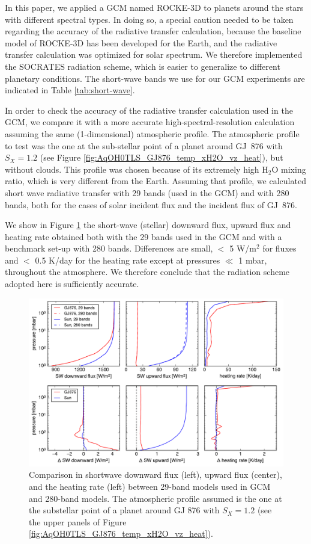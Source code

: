 \documentclass[11pt,numberedappendix,twocolappendix,]{emulateapj}
\def\water{H$_2$O }
\begin{document}
In this paper, we applied a GCM named ROCKE-3D to planets around the stars with different spectral types. 
In doing so, a special caution needed to be taken regarding the accuracy of the radiative transfer calculation, because the baseline model of ROCKE-3D has been developed for the Earth, and the radiative transfer calculation was optimized for solar spectrum. 
We therefore implemented the SOCRATES radiation scheme, which is easier to generalize to different planetary conditions. 
The short-wave bands we use for our GCM experiments are indicated in Table \ref{tab:short-wave}. 

In order to check the accuracy of the radiative transfer calculation used in the GCM, we compare it with a more accurate high-spectral-resolution calculation assuming the same (1-dimensional) atmospheric profile. 
The atmospheric profile to test was the one at the sub-stellar point of a planet around GJ~876 with $S_X=1.2$ (see Figure \ref{fig:AqOH0TLS_GJ876_temp_xH2O_vz_heat}), but without clouds. 
This profile was chosen because of its extremely high \water mixing ratio, which is very different from the Earth. 
Assuming that profile, we calculated short wave radiative transfer with 29 bands (used in the GCM) and with 280 bands, both for the cases of solar incident flux and the incident flux of GJ~876. 

We show in Figure \ref{fig:socrates} the short-wave (stellar) downward flux, upward flux and heating rate obtained both with the 29 bands used in the GCM and with a benchmark set-up with 280 bands. 
Differences are small, $<$ 5 W/m$^2$ for fluxes and $<$ 0.5 K/day for the heating rate except at pressures $\ll$ 1 mbar, throughout the atmosphere. We therefore conclude that the radiation scheme adopted here is sufficiently accurate.

\begin{figure}[!htb]
    \begin{center}
    \includegraphics[width=0.8\hsize]{fig/rad_comparison_SW29-SW280_AqOH0TLS_GJ876S12P20L40Q.pdf}
    \end{center}
\caption{Comparison in shortwave downward flux (left), upward flux (center), and the heating rate (left) between 29-band models used in GCM and 280-band models. The atmospheric profile assumed is the one at the substellar point of a planet around GJ 876 with $S_X=1.2$ (see the upper panels of Figure \ref{fig:AqOH0TLS_GJ876_temp_xH2O_vz_heat}). }
\label{fig:socrates}
\end{figure}
\end{document}
